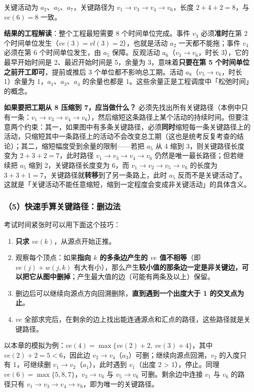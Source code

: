 \documentclass[11pt,openany,UTF8]{ctexbook}
\begin{document}
关键活动为 $a_2$、$a_5$、$a_7$，关键路径为 $v_1\to v_3\to v_4\to v_6$，长度 $2+4+2=8$，与 $ve(6)=8$ 一致。

\textbf{结果的工程解读}：整个工程最短需要 8 个时间单位完成。事件 $v_3$ 必须\textbf{准时}在第 2 个时间单位发生（$ve(3)=vl(3)=2$），也就是活动 $a_2$ 一天都不能拖；事件 $v_4$ 必须在第 6 个时间单位发生，由 $a_5$ 保障。反观活动 $a_6$（$v_3\to v_6$，时长 3），它的最早开始时间是 2、最迟开始时间是 5，余量为 3，意味着\textbf{只要在第 5 个时间单位之前开工即可}，提前或推后 3 个单位都不影响总工期。活动 $a_8$（$v_5\to v_6$，时长 1）余量为 1，$a_1$、$a_3$、$a_4$ 的余量也都是 1。这些余量正是工程调度中「松弛时间」的概念。

\textbf{如果要把工期从 8 压缩到 7，应当做什么？} 必须先找出所有关键路径（本例中只有一条：$v_1\to v_3\to v_4\to v_6$），然后缩短这条路径上某个活动的持续时间。但要注意两个约束：其一，如果图中有多条关键路径，必须\textbf{同时}缩短每一条关键路径上的活动，只缩短其中一条路径上的活动不会改变总工期（这也是统考反复考查的结论）；其二，缩短幅度受到余量的限制——若把 $a_5$ 从 4 缩到 3，则关键路径长度变为 $2+3+2=7$，此时路径 $v_1\to v_3\to v_4\to v_6$ 仍然是唯一最长路径；但若继续把 $a_5$ 缩到 2，关键路径长度变为 6，而 $v_1\to v_2\to v_5\to v_6$ 的长度为 $3+3+1=7$，关键路径就\textbf{转移}到了另一条路上，此时 $a_5$ 反而不是关键活动了。这就是「关键活动不能任意缩短，缩到一定程度会变成非关键活动」的具体含义。

\subsubsection{（5）快速手算关键路径：删边法}

考试时间紧张时可以用下面这个技巧：

\begin{enumerate}
\item \textbf{只求 $ve(k)$}，从源点开始正推。
\item 观察每个顶点：如果\textbf{指向 $k$ 的多条边产生的 $ve$ 值不相等}（即 $ve(j)+w(j,k)$ 有大有小），那么产生\textbf{较小值的那条边一定是非关键边，可以把它从图中删掉}；产生最大值的边（可能有两条及以上）保留。
\item 删边后可以继续向源点方向回溯删除，\textbf{直到遇到一个出度大于 1 的交叉点为止}。
\item $ve$ 全部求完后，在剩余的边上找出能连通源点和汇点的路径，这些路径就是关键路径。
\end{enumerate}
以本章的模拟为例：$ve(4)=\max\{ve(2)+2,\ ve(3)+4\}$，其中 $ve(2)+2=5<6$，因此边 $v_2\to v_4$（$a_3$）可删；继续向源点回溯，$v_2$ 的入度只有 1，可继续删 $v_1\to v_2$（$a_1$），此时遇到 $v_1$（出度 2 > 1），停止。同理 $ve(6)=\max\{5,8,7\}$，$v_3\to v_6$ 与 $v_5\to v_6$ 可删。剩余边中连接 $v_1$ 与 $v_6$ 的路径只有 $v_1\to v_3\to v_4\to v_6$，即为唯一的关键路径。
\end{document}
